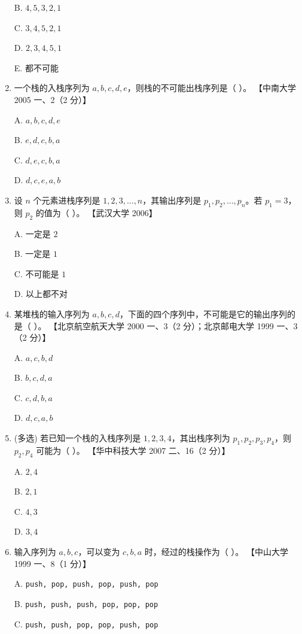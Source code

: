 \documentclass[lang=cn,newtx,10pt,scheme=chinese]{../../elegantbook}
\begin{document}
\begin{enumerate}
    B. $4, 5, 3, 2, 1$  

    C. $3, 4, 5, 2, 1$ 

    D. $2, 3, 4, 5, 1$  

    E. 都不可能  

    \item 一个栈的入栈序列为 $a, b, c, d, e$，则栈的不可能出栈序列是（ ）。  
    【中南大学 2005 一、2（2 分）】  

    A. $a, b, c, d, e$  

    B. $e, d, c, b, a$  

    C. $d, e, c, b, a$  

    D. $d, c, e, a,b$  

    \item 设 $n$ 个元素进栈序列是 $1, 2, 3, \ldots, n$，其输出序列是 $p_1, p_2, \ldots, p_n$。若 $p_1 = 3$，则 $p_2$ 的值为（ ）。  
    【武汉大学 2006】 

    A. 一定是 $2$  

    B. 一定是 $1$  

    C. 不可能是 $1$  

    D. 以上都不对  

    \item 某堆栈的输入序列为 $a, b, c, d$，下面的四个序列中，不可能是它的输出序列的是（ ）。  
    【北京航空航天大学 2000 一、3（2 分）；北京邮电大学 1999 一、3（2 分）】  

    A. $a,c,b,d$  

    B. $b,c,d,a$  

    C. $c, d, b, a$  

    D. $d, c, a, b$  

    \item (多选) 若已知一个栈的入栈序列是 $1, 2, 3, 4$，其出栈序列为 $p_1, p_2, p_3, p_4$，则 $p_2, p_4$ 可能为（ ）。  
    【华中科技大学 2007 二、16（2 分）】  

    A. $2, 4$  

    B. $2, 1$  

    C. $4, 3$  

    D. $3, 4$  

    \item 输入序列为 $a, b, c$，可以变为 $c, b, a$ 时，经过的栈操作为（ ）。  
    【中山大学 1999 一、8（1 分）】  

    A. \texttt{push, pop, push, pop, push, pop}  

    B. \texttt{push, push, push, pop, pop, pop}  

    C. \texttt{push, push, pop, pop, push, pop} 


\end{enumerate}
\end{document}
